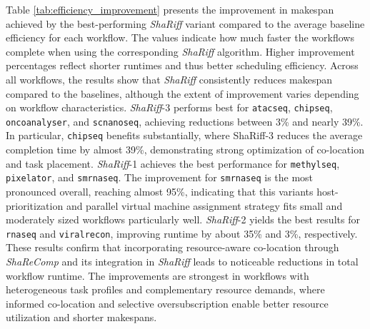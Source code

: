 \noindent
Table \ref{tab:efficiency_improvement} presents the improvement in makespan achieved by the best-performing \textit{ShaRiff} variant compared to the average baseline efficiency for each workflow. The values indicate how much faster the workflows complete when using the corresponding \textit{ShaRiff} algorithm. Higher improvement percentages reflect shorter runtimes and thus better scheduling efficiency.
Across all workflows, the results show that \textit{ShaRiff} consistently reduces makespan compared to the baselines, although the extent of improvement varies depending on workflow characteristics. \textit{ShaRiff}-3 performs best for \texttt{atacseq}, \texttt{chipseq}, \texttt{oncoanalyser}, and \texttt{scnanoseq}, achieving reductions between 3\% and nearly 39\%. In particular, \texttt{chipseq} benefits substantially, where ShaRiff-3 reduces the average completion time by almost 39\%, demonstrating strong optimization of co-location and task placement.
\textit{ShaRiff}-1 achieves the best performance for \texttt{methylseq}, \texttt{pixelator}, and \texttt{smrnaseq}. The improvement for \texttt{smrnaseq} is the most pronounced overall, reaching almost 95\%, indicating that this variants host-prioritization and parallel virtual machine assignment strategy fits small and moderately sized workflows particularly well. \textit{ShaRiff}-2 yields the best results for \texttt{rnaseq} and \texttt{viralrecon}, improving runtime by about 35\% and 3\%, respectively.
These results confirm that incorporating resource-aware co-location through \textit{ShaReComp} and its integration in \textit{ShaRiff} leads to noticeable reductions in total workflow runtime. The improvements are strongest in workflows with heterogeneous task profiles and complementary resource demands, where informed co-location and selective oversubscription enable better resource utilization and shorter makespans.

